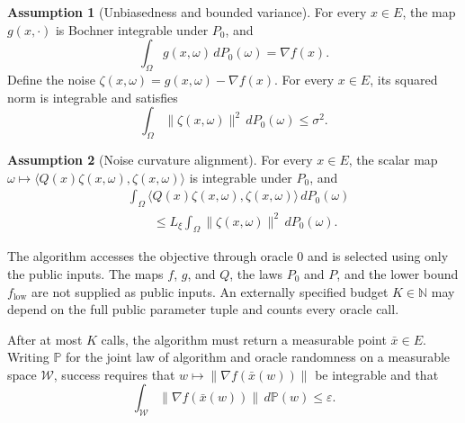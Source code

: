 \documentclass[10pt]{article}
\theoremstyle{definition}
\newtheorem{assumption}{Assumption}
\begin{document}
\begin{assumption}[Unbiasedness and bounded variance]
For every $x\in E$, the map $g(x,\cdot)$ is Bochner integrable under $P_0$, and
\[
\int_\Omega g(x,\omega)\,dP_0(\omega)=\nabla f(x).
\]
Define the noise $\zeta(x,\omega)=g(x,\omega)-\nabla f(x)$. For every $x\in E$, its squared norm is integrable and satisfies
\[
\int_\Omega\|\zeta(x,\omega)\|^2\,dP_0(\omega)\leq\sigma^2.
\]
\end{assumption}

\begin{assumption}[Noise curvature alignment]
For every $x\in E$, the scalar map
$\omega\mapsto\langle Q(x)\zeta(x,\omega),\zeta(x,\omega)\rangle$
is integrable under $P_0$, and
\[
\begin{aligned}
&\int_\Omega\langle Q(x)\zeta(x,\omega),\zeta(x,\omega)\rangle\,dP_0(\omega)\\
&\qquad\leq L_\xi\int_\Omega\|\zeta(x,\omega)\|^2\,dP_0(\omega).
\end{aligned}
\]
\end{assumption}

The algorithm accesses the objective through oracle $0$ and is selected using only the public inputs. The maps $f$, $g$, and $Q$, the laws $P_0$ and $P$, and the lower bound $f_{\mathrm{low}}$ are not supplied as public inputs. An externally specified budget $K\in\mathbb{N}$ may depend on the full public parameter tuple and counts every oracle call.

After at most $K$ calls, the algorithm must return a measurable point $\bar{x}\in E$. Writing $\mathbb{P}$ for the joint law of algorithm and oracle randomness on a measurable space $\mathcal{W}$, success requires that $w\mapsto\|\nabla f(\bar{x}(w))\|$ be integrable and that
\[
\int_{\mathcal{W}}\|\nabla f(\bar{x}(w))\|\,d\mathbb{P}(w)
\leq\varepsilon.
\]
\end{document}
